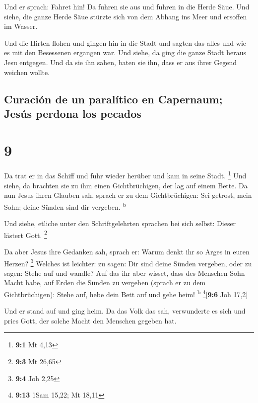  Und er sprach: Fahret hin! Da fuhren sie aus und fuhren
in die Herde Säue. Und siehe, die ganze Herde Säue stürzte sich von dem
Abhang ins Meer und ersoffen im Wasser.

 Und die Hirten flohen und gingen hin in die Stadt und
sagten das alles und wie es mit den Besessenen ergangen war.
 Und siehe, da ging die ganze Stadt heraus Jesu entgegen.
Und da sie ihn sahen, baten sie ihn, dass er aus ihrer Gegend weichen
wollte.

\hypertarget{curaciuxf3n-de-un-paraluxedtico-en-capernaum-jesuxfas-perdona-los-pecados}{%
\subsection{Curación de un paralítico en Capernaum; Jesús perdona los
pecados}\label{curaciuxf3n-de-un-paraluxedtico-en-capernaum-jesuxfas-perdona-los-pecados}}

\hypertarget{section-8}{%
\section{9}\label{section-8}}

 Da trat er in das Schiff und fuhr wieder herüber und kam
in seine Stadt. \footnote{\textbf{9:1} Mt 4,13}  Und
siehe, da brachten sie zu ihm einen Gichtbrüchigen, der lag auf einem
Bette. Da nun Jesus ihren Glauben sah, sprach er zu dem Gichtbrüchigen:
Sei getrost, mein Sohn; deine Sünden sind dir vergeben.
\textsuperscript{b}

 Und siehe, etliche unter den Schriftgelehrten sprachen
bei sich selbst: Dieser lästert Gott. \footnote{\textbf{9:3} Mt 26,65}

 Da aber Jesus ihre Gedanken sah, sprach er: Warum denkt
ihr so Arges in euren Herzen? \footnote{\textbf{9:4} Joh 2,25}
 Welches ist leichter: zu sagen: Dir sind deine Sünden
vergeben, oder zu sagen: Stehe auf und wandle?  Auf das
ihr aber wisset, dass des Menschen Sohn Macht habe, auf Erden die Sünden
zu vergeben (sprach er zu dem Gichtbrüchigen): Stehe auf, hebe dein Bett
auf und gehe heim! \textsuperscript{b} \footnote{\textbf{9:13} 1Sam
  15,22; Mt 18,11}{[}\textbf{9:6} Joh 17,2{]}

 Und er stand auf und ging heim.  Da das
Volk das sah, verwunderte es sich und pries Gott, der solche Macht den
Menschen gegeben hat.

